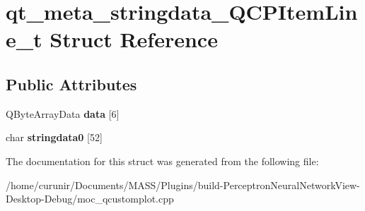 \hypertarget{structqt__meta__stringdata___q_c_p_item_line__t}{}\section{qt\+\_\+meta\+\_\+stringdata\+\_\+\+Q\+C\+P\+Item\+Line\+\_\+t Struct Reference}
\label{structqt__meta__stringdata___q_c_p_item_line__t}
\subsection*{Public Attributes}
\begin{DoxyCompactItemize}
\item 
Q\+Byte\+Array\+Data {\bfseries data} \mbox{[}6\mbox{]}\hypertarget{structqt__meta__stringdata___q_c_p_item_line__t_a4caaf475c8c9a2899091e373fb1c6d49}{}\label{structqt__meta__stringdata___q_c_p_item_line__t_a4caaf475c8c9a2899091e373fb1c6d49}

\item 
char {\bfseries stringdata0} \mbox{[}52\mbox{]}\hypertarget{structqt__meta__stringdata___q_c_p_item_line__t_a35c5e2ac8b06d8035260983dc8b9dafa}{}\label{structqt__meta__stringdata___q_c_p_item_line__t_a35c5e2ac8b06d8035260983dc8b9dafa}

\end{DoxyCompactItemize}


The documentation for this struct was generated from the following file\+:\begin{DoxyCompactItemize}
\item 
/home/curunir/\+Documents/\+M\+A\+S\+S/\+Plugins/build-\/\+Perceptron\+Neural\+Network\+View-\/\+Desktop-\/\+Debug/moc\+\_\+qcustomplot.\+cpp\end{DoxyCompactItemize}
